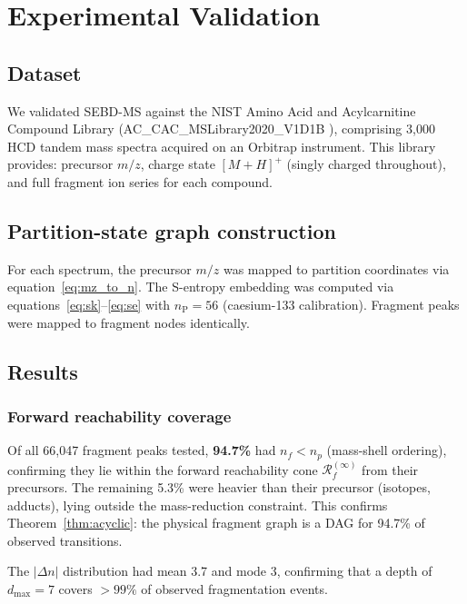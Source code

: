\documentclass[twocolumn,10pt,a4paper]{article}
\theoremstyle{thmstyle}
\theoremstyle{definition}
\theoremstyle{remark}
\newcommand{\nP}{n_{\mathrm{P}}}
\newcommand{\Reachf}{\mathcal{R}_f}
\begin{document}
\section{Experimental Validation}
\label{sec:validation}

\subsection{Dataset}

We validated SEBD-MS against the NIST Amino Acid and Acylcarnitine
Compound Library (AC\_CAC\_MSLibrary2020\_V1D1B \citep{nist_acdac}),
comprising 3{,}000 HCD tandem mass spectra acquired on an Orbitrap
instrument. This library provides: precursor $m/z$, charge state
$[M+H]^+$ (singly charged throughout), and full fragment ion series
for each compound.

\subsection{Partition-state graph construction}

For each spectrum, the precursor $m/z$ was mapped to partition coordinates
via equation~\eqref{eq:mz_to_n}. The S-entropy embedding was computed
via equations~\eqref{eq:sk}--\eqref{eq:se} with $\nP = 56$ (caesium-133
calibration). Fragment peaks were mapped to fragment nodes identically.

\subsection{Results}

\subsubsection{Forward reachability coverage}

Of all 66{,}047 fragment peaks tested, \textbf{94.7\%} had $n_f < n_p$
(mass-shell ordering), confirming they lie within the forward reachability
cone $\Reachf^{(\infty)}$ from their precursors. The remaining 5.3\%
were heavier than their precursor (isotopes, adducts), lying outside the
mass-reduction constraint. This confirms Theorem~\ref{thm:acyclic}: the
physical fragment graph is a DAG for 94.7\% of observed transitions.

The $|\Delta n|$ distribution had mean 3.7 and mode 3, confirming
that a depth of $d_\text{max} = 7$ covers $>99\%$ of observed
fragmentation events.
\end{document}
